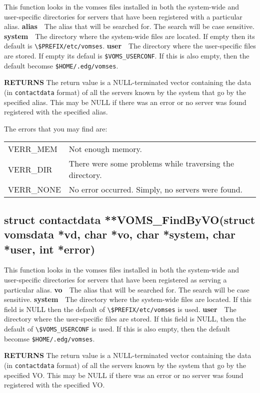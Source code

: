 \documentclass[a4paper]{book}
\newcommand{\return}{\noindent \textbf{RETURNS}\newline}
\newcommand{\parameter}[1]{\newline\textbf{#1}\ \ }
\begin{document}
This function looks in the vomses files installed in both the
system-wide and user-specific directories for servers that have been
registered with a particular alias.
\parameter{alias}{The alias that will be searched for.  The search will be case
sensitive.}
\parameter{system}{The directory where the system-wide files are located.  
  If empty then its default is \verb|\$PREFIX/etc/vomses|.}
\parameter{user}{The directory where the user-specific files are
  stored.  If empty its defaul is \verb|$VOMS_USERCONF|.  If this is
  also empty, then the default becomse \verb|$HOME/.edg/vomses|.}

\return
The return value is a NULL-terminated vector containing the data (in
\verb|contactdata| format) of all the servers known by the system
  that go by the specified alias.  This may be NULL if there was an
  error or no server was found registered with the specified alias.

The errors that you may find are:

\bigskip\begin{tabular}{lp{3in}}
VERR\_MEM  & Not enough memory.\\
VERR\_DIR  & There were some problems while traversing the directory.\\
VERR\_NONE & No error occurred. Simply, no servers were found.\\


\end{tabular}
\subsection{struct contactdata **VOMS\_FindByVO(struct vomsdata *vd,
  char *vo, char *system, char *user, int *error)}

This function looks in the vomses files installed in both the
system-wide and user-specific directories for servers that have been
registered as serving a particular alias.
\parameter{vo}{The alias that will be searched for.  The search will
be case sensitive.}
\parameter{system}{The directory where the system-wide files are
  located.  If this field is NULL then the default of
  \verb|\$PREFIX/etc/vomses| is used.}
\parameter{user}{The directory where the user-specific files are
  stored.  If this field is NULL, then the default of
  \verb|\$VOMS_USERCONF| is used.  If this is also empty, then the
  default becomse \verb|$HOME/.edg/vomses|.}

\return
The return value is a NULL-terminated vector containing the data (in
\verb|contactdata| format) of all the servers known by the system
  that go by the specified VO.  This may be NULL if there was an
  error or no server was found registered with the specified VO.
\end{document}
